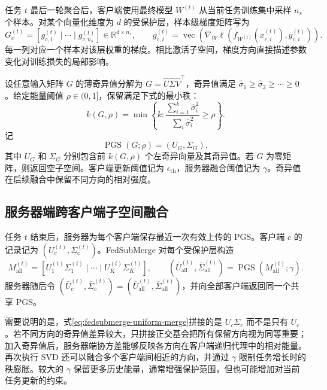 任务 $t$ 最后一轮聚合后，客户端使用最终模型 $W^{(t)}$ 从当前任务训练集中采样 $n_s$ 个样本。对某个向量化维度为 $d$ 的受保护层，样本级梯度矩阵写为
\begin{equation}
G_c^{(t)}
=
\left[
 g_{c,1}^{(t)}\mid\cdots\mid g_{c,n_s}^{(t)}
\right]
\in\mathbb{R}^{d\times n_s},
\qquad
 g_{c,i}^{(t)}
=
\operatorname{vec}\!\left(
\nabla_W\ell\!\left(f_{W^{(t)}}(x_{c,i}^{(t)}),y_{c,i}^{(t)}\right)
\right).
\label{eq:fedsubmerge-gradient-matrix}
\end{equation}
每一列对应一个样本对该层权重的梯度。相比激活子空间，梯度方向直接描述参数变化对训练损失的局部影响。

设任意输入矩阵 $G$ 的薄奇异值分解为
$G=\widehat U\widehat\Sigma\widehat V^{\top}$，奇异值满足
$\widehat\sigma_1\geq\widehat\sigma_2\geq\cdots\geq0$。给定能量阈值 $\rho\in(0,1]$，保留满足下式的最小秩：
\begin{equation}
k(G,\rho)
=
\min\left\{k:
\frac{\sum_{i=1}^{k}\widehat\sigma_i^2}
     {\sum_i\widehat\sigma_i^2}
\geq\rho
\right\}.
\label{eq:fedsubmerge-energy-rule}
\end{equation}
记
\begin{equation}
\operatorname{PGS}(G;\rho)=(U_G,\Sigma_G),
\label{eq:fedsubmerge-pgs-operator}
\end{equation}
其中 $U_G$ 和 $\Sigma_G$ 分别包含前 $k(G,\rho)$ 个左奇异向量及其奇异值。若 $G$ 为零矩阵，则返回空子空间。客户端更新阈值记为 $\epsilon_{\mathrm{th}}$，服务器融合阈值记为 $\gamma$。奇异值在后续融合中保留不同方向的相对强度。

\subsection{服务器端跨客户端子空间融合}
\label{subsec:fedsubmerge-server-merge}

任务 $t$ 结束后，服务器为每个客户端保存最近一次有效上传的 PGS。客户端 $c$ 的记录记为
$(U_c^{(t)},\Sigma_c^{(t)})$。FedSubMerge 对每个受保护层构造
\begin{equation}
M_{\mathrm{all}}^{(t)}
=
\left[
U_1^{(t)}\Sigma_1^{(t)}
\mid\cdots\mid
U_K^{(t)}\Sigma_K^{(t)}
\right],
\qquad
(\bar U_{\mathrm{all}}^{(t)},\bar\Sigma_{\mathrm{all}}^{(t)})
=
\operatorname{PGS}\!\left(M_{\mathrm{all}}^{(t)};\gamma\right).
\label{eq:fedsubmerge-uniform-merge}
\end{equation}
服务器随后令
$(\bar U_c^{(t)},\bar\Sigma_c^{(t)})=(\bar U_{\mathrm{all}}^{(t)},\bar\Sigma_{\mathrm{all}}^{(t)})$，并向全部客户端返回同一个共享 PGS。

需要说明的是，式\eqref{eq:fedsubmerge-uniform-merge}拼接的是 $U_c\Sigma_c$ 而不是只有 $U_c$。若不同方向的奇异值差异较大，只拼接正交基会把所有保留方向视为同等重要；加入奇异值后，服务器端协方差能够反映各方向在客户端递归代理中的相对能量。再次执行 SVD 还可以融合多个客户端间相近的方向，并通过 $\gamma$ 限制任务增长时的秩膨胀。较大的 $\gamma$ 保留更多历史能量，通常增强保护范围，但也可能增加对当前任务更新的约束。

